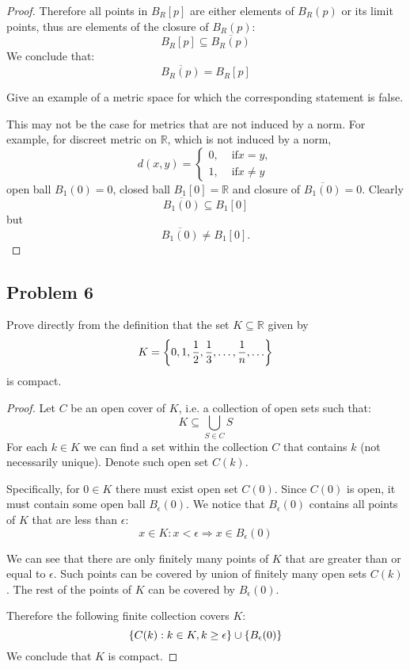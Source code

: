\documentclass{article}
\newcommand{\R}{\mathbb{R}}
\DeclarePairedDelimiter{\set}{ \{ }{ \} }
\begin{document}
\begin{proof}
Therefore all points in $B_R[p]$ are either elements of $B_R(p)$ or its limit points, thus are elements of the closure of $B_R(p)$:
\[ B_R[p] \subseteq \overline{B_R(p)} \]
We conclude that:
\[ \overline{B_R(p)} = B_R[p] \]

\begin{tcolorbox}
Give an example of a metric space for which the corresponding statement is false.
\end{tcolorbox}

This may not be the case for metrics that are not induced by a norm. For example, for discreet metric on $\R$, which is not induced by a norm,
\[
    d(x, y) = 
    \begin{cases}
    0, & \text{ if} x = y,\\
    1, & \text{ if} x \neq y
    \end{cases}
\]
open ball $B_1(0) = {0}$, closed ball $B_1[0] = \R$ and closure of $\overline{B_1(0)} = {0}$. Clearly
\[ \overline{B_1(0)} \subseteq B_1[0] \]
but
\[ \overline{B_1(0)} \neq B_1[0]. \]

\end{proof}


\subsection*{Problem 6}

\begin{tcolorbox}
Prove directly from the definition that the set $K \subseteq \R$ given by
\[ K = \set*{ 0, 1, \frac{1}{2}, \frac{1}{3}, \dots , \frac{1}{n}, \dots } \]
is compact.
\end{tcolorbox}

\begin{proof}

Let $C$ be an open cover of $K$, i.e. a collection of open sets such that:
\[ K \subseteq \bigcup_{S \in C} S \]
For each $k \in K$ we can find a set within the collection $C$ that contains $k$ (not necessarily unique).
Denote such open set $C(k)$.

Specifically, for $0 \in K$ there must exist open set $C(0)$.
Since $C(0)$ is open, it must contain some open ball $B_\epsilon(0)$.
We notice that $B_\epsilon(0)$ contains all points of $K$ that are less than $\epsilon$:
\[ x \in K : x < \epsilon \Rightarrow x \in B_\epsilon(0) \]

We can see that there are only finitely many points of $K$ that are greater than or equal to $\epsilon$.
Such points can be covered by union of finitely many open sets $C(k)$.
The rest of the points of $K$ can be covered by $B_\epsilon(0)$.

Therefore the following finite collection covers $K$:
\[ \set{ C(k) : k \in K, k \geq \epsilon }  \cup \set{ B_\epsilon(0) } \]
We conclude that $K$ is compact.

\end{proof}
\end{document}
